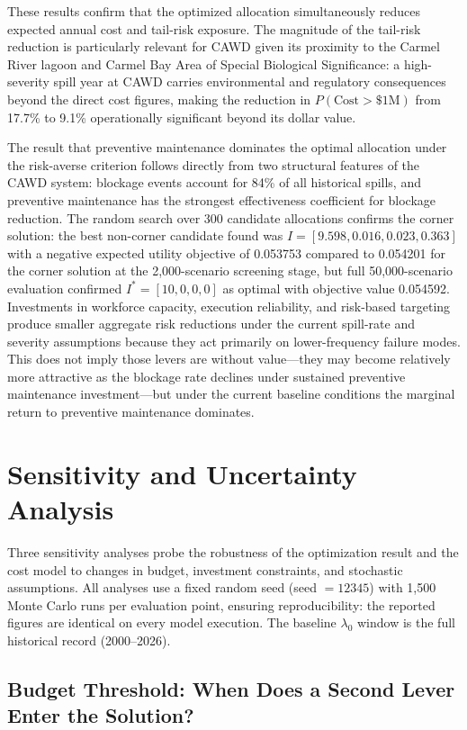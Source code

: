 \documentclass[10pt]{article}
\begin{document}
\begin{multicols}{2}
These results confirm that the optimized allocation simultaneously
reduces expected annual cost and tail-risk exposure. The magnitude
of the tail-risk reduction is particularly relevant for CAWD given
its proximity to the Carmel River lagoon and Carmel Bay Area of
Special Biological Significance: a high-severity spill year at CAWD
carries environmental and regulatory consequences beyond the direct
cost figures, making the reduction in $P(\text{Cost} > \$1\text{M})$
from 17.7\% to 9.1\% operationally significant beyond its dollar
value.
 
The result that preventive maintenance dominates the optimal
allocation under the risk-averse criterion follows directly from two
structural features of the CAWD system: blockage events account for
84\% of all historical spills, and preventive maintenance has the
strongest effectiveness coefficient for blockage reduction. The
random search over 300 candidate allocations confirms the corner
solution: the best non-corner candidate found was
$I = [9.598, 0.016, 0.023, 0.363]$ with a negative expected
utility objective of 0.053753 compared to 0.054201 for the corner
solution at the 2{,}000-scenario screening stage, but full
50{,}000-scenario evaluation confirmed $I^* = [10,0,0,0]$ as
optimal with objective value 0.054592. Investments in workforce
capacity, execution reliability, and risk-based targeting produce
smaller aggregate risk reductions under the current spill-rate and
severity assumptions because they act primarily on lower-frequency
failure modes. This does not imply those levers are without
value---they may become relatively more attractive as the blockage
rate declines under sustained preventive maintenance
investment---but under the current baseline conditions the marginal
return to preventive maintenance dominates.

\section{Sensitivity and Uncertainty Analysis}

Three sensitivity analyses probe the robustness of the optimization
result and the cost model to changes in budget, investment constraints,
and stochastic assumptions. All analyses use a fixed random seed
(seed $= 12345$) with 1{,}500 Monte Carlo runs per evaluation point,
ensuring reproducibility: the reported figures are identical on every
model execution. The baseline $\lambda_0$ window is the full
historical record (2000--2026).

\subsection{Budget Threshold: When Does a Second Lever Enter the
Solution?}


\end{multicols}
\end{document}
